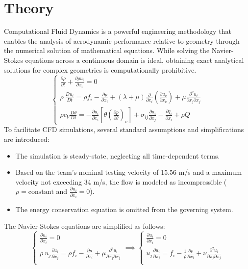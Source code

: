 \documentclass[a4paper]{article}
\begin{document}
	\section{Theory}
	Computational Fluid Dynamics is a powerful engineering methodology that enables the analysis of aerodynamic performance relative to geometry through the numerical solution of mathematical equations.
	While solving the Navier-Stokes equations across a continuous domain is ideal, obtaining exact analytical solutions for complex geometries is computationally prohibitive.
	\[ \begin{cases}
		{\frac{\partial{\rho}}{\partial{t}}}+{\frac{\partial{\rho u_{i}}}{\partial{x_{i}}}}=0\\
		\rho\  \frac{Du_{i}}{Dt}= \rho f_{i} - \frac{\partial p}{\partial x_{i}} + (\lambda+ \mu)\frac{\partial }{\partial x_{i}}\left( \frac{\partial u_{k}}{\partial x_{k}}\right)+ \mu \frac{\partial^{2} u_{i}}{\partial x_{j} \partial x_{j}}\\
		\rho c_{V} \frac{D\theta}{Dt}=-\frac{\partial{u_{i}}}{\partial{x_{i}}} \left[\theta  \left(\frac{\partial{p}}{\partial{\theta}}\right)_{v}\right]+\sigma_{ij} \frac{\partial{u_{i}}}{\partial{x_{j}}}- \frac{\partial{q_{i}}}{\partial{x_{i}}}+ \rho Q
	\end{cases} \]
	To facilitate CFD simulations, several standard assumptions and simplifications are introduced:
	\begin{itemize}
		\item The simulation is steady-state, neglecting all time-dependent terms.
		\item Based on the team's nominal testing velocity of 15.56 m/s and a maximum velocity not exceeding 34 m/s, the flow is modeled as incompressible ($\rho = \text{constant}$ and $\frac{\partial u_i}{\partial{x_i}}=0$).
		\item The energy conservation equation is omitted from the governing system.
	\end{itemize}
	The Navier-Stokes equations are simplified as follows:
	\[ \begin{cases}
		{\frac{\partial{ u_{i}}}{\partial{x_{i}}}}=0\\
		\rho\ u_j \frac{\partial u_{i}}{\partial x_j}= \rho f_{i} - \frac{\partial p}{\partial x_{i}}+ \mu \frac{\partial^{2} u_{i}}{\partial x_{j} \partial x_{j}}\\
	\end{cases}\implies \begin{cases}
		{\frac{\partial{ u_{i}}}{\partial{x_{i}}}}=0\\
		u_j \frac{\partial u_{i}}{\partial x_j}=  f_{i} - \frac{1}{\rho}\frac{\partial p}{\partial x_{i}}+ \nu \frac{\partial^{2} u_{i}}{\partial x_{j} \partial x_{j}}\\
	\end{cases} \]
\end{document}
